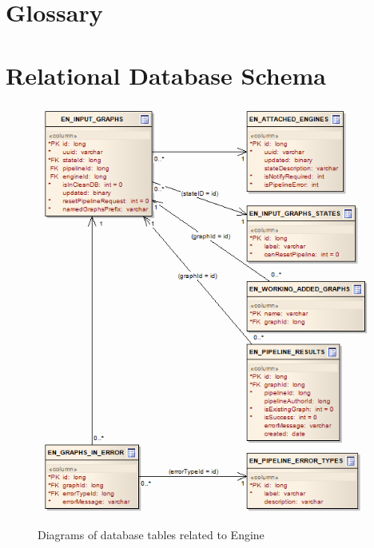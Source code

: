 \begin{description}[style=nextline,font=\ttfamily]

\appendix

\chapter{Glossary}
\label{chap:glossary}



\chapter{Relational Database Schema}
\label{chap:reldb}

\begin{figure}[htbp]
    \centering
    \includegraphics[scale=0.6]{images/db-engine.png}
    \caption{Diagrams of database tables related to Engine}
	\label{fig:dbEngine}
\end{figure}


\end{description}
